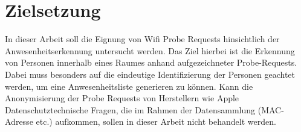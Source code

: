 \section{Zielsetzung}
\label{goal}

In dieser Arbeit soll die Eignung von Wifi Probe Requests hinsichtlich der Anwesenheitserkennung untersucht werden.
Das Ziel hierbei ist die Erkennung von Personen innerhalb eines Raumes anhand aufgezeichneter Probe-Requests.
\\

Dabei muss besonders auf die eindeutige Identifizierung der Personen geachtet werden, um eine Anwesenheitsliste generieren zu können.
Kann die Anonymisierung der Probe Requests von Herstellern wie Apple 
Datenschutztechnische Fragen, die im Rahmen der Datensammlung (MAC-Adresse etc.) aufkommen, sollen in dieser Arbeit nicht behandelt werden.